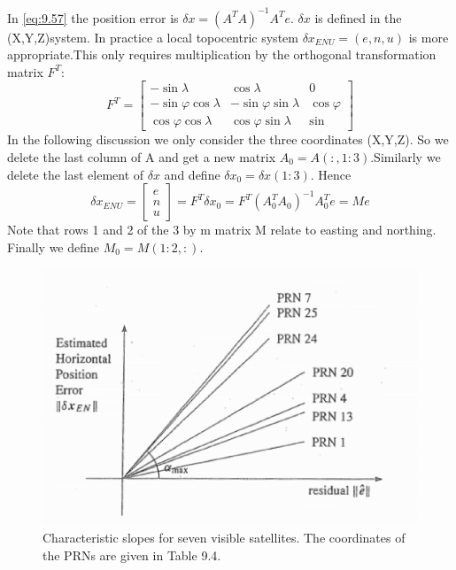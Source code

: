 		In \ref{eq:9.57} the position error is $\delta x = (A^TA)^{-1}A^Te$. $\delta x$ is defined in the (X,Y,Z)system. In practice a local topocentric system $\delta x_{ENU} = (e,n,u)$ is more appropriate.This only requires multiplication by the orthogonal transformation matrix $F^T$:
		\begin{equation}\label{eq:9.64}
			F^T = 
			\begin{bmatrix}
			-\sin \lambda & \cos \lambda & 0 \\
			-\sin \varphi \cos \lambda & -\sin \varphi \sin \lambda & \cos \varphi \\
			\cos \varphi \cos \lambda & \cos \varphi \sin \lambda & \sin
			\end{bmatrix}
		\end{equation}
		In the following discussion we only consider the three coordinates (X,Y,Z). So we delete the last column of A and get a new matrix $A_0=A(:,1:3)$.Similarly we delete the last element of $\delta x$ and define $\delta x_0 = \delta x(1:3)$. Hence
		\begin{equation}\label{eq:9.65}
			\delta x_{ENU} = 
			\begin{bmatrix}
			e \\ n \\ u
			\end{bmatrix}
			= F^T\delta x_0 = F^T(A^T_0A_0)^{-1}A^T_0e = Me
		\end{equation}
		Note that rows 1 and 2 of the 3 by m matrix M relate to easting and northing. Finally we define $M_0 = M(1:2,:)$.
		\begin{figure}
			\centering
			\includegraphics[width=0.7\linewidth]{TeX_files/Part03/chapter09/image/9-23}
			\caption{Characteristic slopes for seven visible satellites. The coordinates of the PRNs are given in Table 9.4.}
			\label{fig:9-23}
		\end{figure}
		

